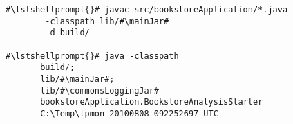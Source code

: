 \begin{lstlisting}[caption=Commands to compile and run the analysis under Windows,label=lst:bookstoreAnalysisStarterWin] 			
#\lstshellprompt{}# javac src/bookstoreApplication/*.java
        -classpath lib/#\mainJar#
        -d build/

#\lstshellprompt{}# java -classpath 
       build/;
       lib/#\mainJar#;
       lib/#\commonsLoggingJar#
       bookstoreApplication.BookstoreAnalysisStarter 
       C:\Temp\tpmon-20100808-092252697-UTC
\end{lstlisting}	
